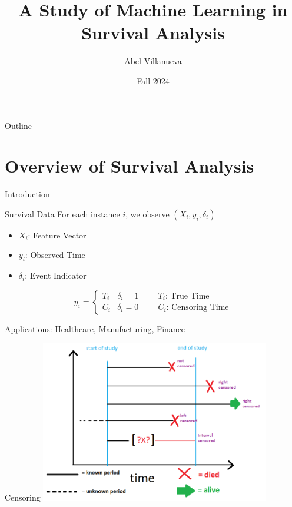 \documentclass{beamer}
\title{A Study of Machine Learning in Survival Analysis}
\author{Abel Villanueva}
\institute{University of North Carolina at Charlotte}
\date{Fall 2024}
\begin{document}
\frame{\titlepage}

\begin{frame}{Outline}
\tableofcontents
\end{frame}

\section{Overview of Survival Analysis}
\begin{frame}{Introduction}
\begin{block}{Survival Data}
    For each instance $i$, we observe $(X_i, y_i, \delta_i)$ 
    \begin{itemize}
        \item $X_i$: Feature Vector
        \item $y_i$: Observed Time
        \item $\delta_i$: Event Indicator
    \end{itemize}
    \begin{equation*}
        y_i = \begin{cases}
            T_i & \delta_i = 1 \hspace{1cm} T_i\text{: True Time}\\
            C_i & \delta_i = 0\hspace{1cm} C_i\text{: Censoring Time}
        \end{cases}
    \end{equation*}
\end{block}

Applications: Healthcare, Manufacturing, Finance \cite{WangEtAl}
\end{frame}

\begin{frame}{Censoring}
\centering
\includegraphics[width=0.75\textwidth]{images/censor.png}
\end{frame}
\end{document}
